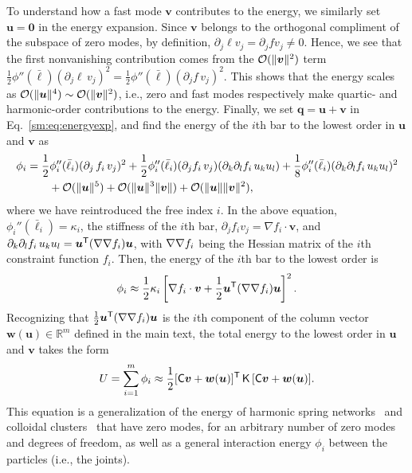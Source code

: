 To understand how a fast mode $\bm{v}$ contributes to the energy, we similarly set $\bm{u} = \bm{0}$ in the energy expansion.
Since $\bm{v}$ belongs to the orthogonal compliment of the subspace of zero modes, by definition, $\partial_j \ell v_j = \partial_j f v_j \ne 0$.
Hence, we see that the first nonvanishing contribution comes from the $\mathcal{O}(\lVert\bm{v}\rVert^2)$ term $\frac{1}{2}\phi''(\bar{\ell})(\partial_j \ell\, v_j)^2 = \frac{1}{2}\phi''(\bar{\ell})(\partial_j f\, v_j)^2$.
This shows that the energy scales as $\mathcal{O}(\lVert\bm{u}\rVert^4) \sim \mathcal{O}(\lVert\bm{v}\rVert^2)$, i.e., zero and fast modes respectively make quartic- and harmonic-order contributions to the energy.
Finally, we set $\bm{q} = \bm{u} + \bm{v}$ in Eq.~\eqref{sm:eq:energyexp}, and find the energy of the $i$th bar to the lowest order in $\bm{u}$ and $\bm{v}$ as
%
\begin{equation}
  \begin{aligned}
    \phi_i &= \frac{1}{2}\phi_i''(\bar{\ell}_i)(\partial_j\, f_i\, v_j)^2 + \frac{1}{2}\phi''_i(\bar{\ell}_i)(\partial_j f_i\, v_j)(\partial_k \partial_l f_i\, u_k u_l) + \frac{1}{8}\phi''_i(\bar{\ell}_i)(\partial_k \partial_l f_i\, u_k u_l)^2\\
           &\qquad+ \mathcal{O}(\lVert\bm{u}\rVert^5) + \mathcal{O}(\lVert\bm{u}\rVert^{3}\lVert\bm{v}\rVert) +\mathcal{O}(\lVert\bm{u}\rVert\lVert\bm{v}\rVert^{2}),
  \end{aligned}
\end{equation}
%
where we have reintroduced the free index $i$.
In the above equation, $\phi_{i}''(\bar{\ell}_i) = \kappa_i$, the stiffness of the $i$th bar, $\partial_j f_i v_j = \nabla f_i\cdot\bm{v}$, and $\partial_k\partial_l f_i\, u_k u_l = \bm{u}^\mathsf{T}(\nabla\nabla f_i)\bm{u}$, with $\nabla\nabla f_i$ being the Hessian matrix of the $i$th constraint function $f_i$.
Then, the energy of the $i$th bar to the lowest order is
%
\begin{equation}
  \phi_i \approx \frac{1}{2}\kappa_i \left[\nabla f_i\cdot\bm{v} + \frac{1}{2}\bm{u}^\mathsf{T}(\nabla\nabla f_i)\bm{u}\right]^2.
\end{equation}
%
Recognizing that $\frac{1}{2}\bm{u}^\mathsf{T}(\nabla\nabla f_{i})\bm{u}$ is the $i$th component of the column vector $\bm{w}(\bm{u}) \in \mathbb{R}^{m}$ defined in the main text, the total energy to the lowest order in $\bm{u}$ and $\bm{v}$ takes the form
%
\begin{equation}
  U = \sum_{i=1}^m \phi_i \approx \frac{1}{2} [\mathsf{C}\bm{v} + \bm{w}(\bm{u})]^\mathsf{T}\,\mathsf{K}\,[\mathsf{C}\bm{v} + \bm{w}(\bm{u})].
  \label{eq:energy_singular}
\end{equation}
%
This equation is a generalization of the energy of harmonic spring networks~\cite{zhang2016,woodhouse2018} and colloidal clusters~\cite{kallus2017} that have zero modes, for an arbitrary number of zero modes and degrees of freedom, as well as a general interaction energy $\phi_{i}$ between the particles (i.e., the joints).
